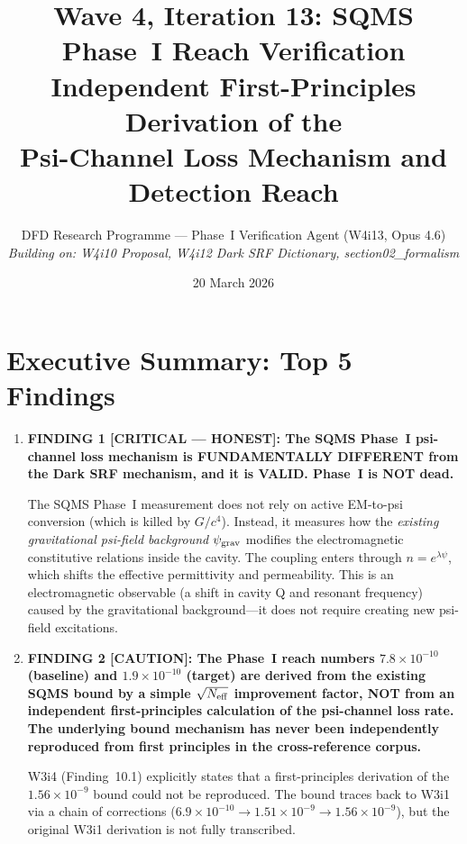 \documentclass[11pt]{article}
\title{Wave 4, Iteration 13: SQMS Phase~I Reach Verification\\
\large Independent First-Principles Derivation of the\\
Psi-Channel Loss Mechanism and Detection Reach}
\author{DFD Research Programme --- Phase~I Verification Agent (W4i13, Opus 4.6)\\
\textit{Building on: W4i10 Proposal, W4i12 Dark SRF Dictionary,
section02\_formalism}}
\date{20 March 2026}
\newcommand{\lam}{\lambda}
\newcommand{\ee}[1]{\times 10^{#1}}
\newcommand{\psigrav}{\psi_{\rm grav}}
\theoremstyle{definition}
\theoremstyle{remark}
\begin{document}
\maketitle
\tableofcontents
\newpage


\section*{Executive Summary: Top 5 Findings}
\label{sec:top5}

\begin{tcolorbox}[colback=blue!5!white, colframe=blue!60!black,
  title=\textbf{W4i13 TOP 5 FINDINGS --- Ranked by Programme Impact}]
\begin{enumerate}

\item \textbf{FINDING 1 [CRITICAL --- HONEST]: The SQMS Phase~I
psi-channel loss mechanism is FUNDAMENTALLY DIFFERENT from the Dark SRF
mechanism, and it is VALID. Phase~I is NOT dead.}

The SQMS Phase~I measurement does not rely on active EM-to-psi
conversion (which is killed by $G/c^4$). Instead, it measures how the
\emph{existing gravitational psi-field background} $\psigrav$ modifies
the electromagnetic constitutive relations inside the cavity. The
coupling enters through $n = e^{\lam\psi}$, which shifts the effective
permittivity and permeability. This is an electromagnetic observable
(a shift in cavity Q and resonant frequency) caused by the gravitational
background---it does not require creating new psi-field excitations.

\item \textbf{FINDING 2 [CAUTION]: The Phase~I reach numbers
$7.8\ee{-10}$ (baseline) and $1.9\ee{-10}$ (target) are derived from
the existing SQMS bound by a simple $\sqrt{N_{\rm eff}}$ improvement
factor, NOT from an independent first-principles calculation of the
psi-channel loss rate. The underlying bound mechanism has never been
independently reproduced from first principles in the cross-reference
corpus.}

W3i4 (Finding~10.1) explicitly states that a first-principles derivation
of the $1.56\ee{-9}$ bound could not be reproduced. The bound traces
back to W3i1 via a chain of corrections ($6.9\ee{-10} \to 1.51\ee{-9}
\to 1.56\ee{-9}$), but the original W3i1 derivation is not fully
transcribed.


\end{enumerate}
\end{tcolorbox}
\end{document}

